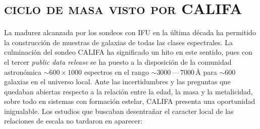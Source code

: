 \documentclass{article}
\begin{document}
\section{\textsc{ciclo de masa visto por CALIFA}}
%
La madurez alcanzada por los sondeos con IFU en la última década ha permitido la construcción de
muestras de galaxias de todas las clases espectrales. La culminación del sondeo CALIFA
\citep{Sanchez2012, Sanchez2016} ha significado un hito en este sentido, pues con el tercer
\emph{public data release} se ha puesto a la disposición de la comunidad astronómica
$\sim600\times1000$ espectros en el rango $\sim3000\,$---$\,7000\,$\AA{} para $\sim600$ galaxias en
el universo local.
Ante las incertidumbres y las preguntas que quedaban abiertas respecto a la relación entre la edad,
la masa y la metalicidad, sobre todo en sistemas con formación estelar, CALIFA presenta una
oportunidad inigualable. Los estudios que buscaban desentrañar el caracter local de las relaciones
de escala no tardaron en aparecer:
%
\end{document}

